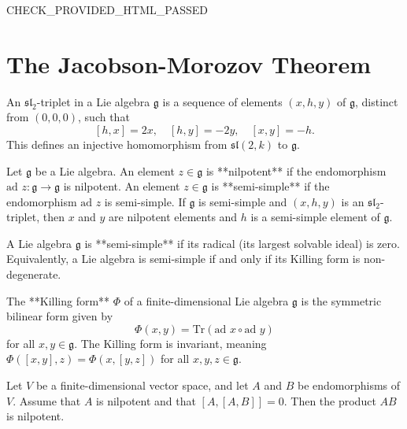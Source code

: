 CHECK_PROVIDED_HTML_PASSED

\chapter{The Jacobson-Morozov Theorem}

\begin{definition}
    \label{def:sl2_triplet}
    An $\mathfrak{sl}_2$-triplet in a Lie algebra $\mathfrak{g}$ is a sequence of elements $(x, h, y)$ of $\mathfrak{g}$, distinct from $(0, 0, 0)$, such that
    $$[h, x] = 2x, \quad [h, y] = -2y, \quad [x, y] = -h.$$
    This defines an injective homomorphism from $\mathfrak{sl}(2, k)$ to $\mathfrak{g}$.
\end{definition}

\begin{definition}
    \label{def:nilpotent_and_semi_simple_elements}
    Let $\mathfrak{g}$ be a Lie algebra. An element $z \in \mathfrak{g}$ is **nilpotent** if the endomorphism $\text{ad } z: \mathfrak{g} \to \mathfrak{g}$ is nilpotent. An element $z \in \mathfrak{g}$ is **semi-simple** if the endomorphism $\text{ad } z$ is semi-simple. If $\mathfrak{g}$ is semi-simple and $(x, h, y)$ is an $\mathfrak{sl}_2$-triplet, then $x$ and $y$ are nilpotent elements and $h$ is a semi-simple element of $\mathfrak{g}$.
\end{definition}

\begin{definition}
    \label{def:semi_simple_lie_algebra}
    A Lie algebra $\mathfrak{g}$ is **semi-simple** if its radical (its largest solvable ideal) is zero. Equivalently, a Lie algebra is semi-simple if and only if its Killing form is non-degenerate.
\end{definition}

\begin{definition}
    \label{def:killing_form}
    The **Killing form** $\Phi$ of a finite-dimensional Lie algebra $\mathfrak{g}$ is the symmetric bilinear form given by
    $$\Phi(x, y) = \text{Tr}(\text{ad } x \circ \text{ad } y)$$
    for all $x, y \in \mathfrak{g}$. The Killing form is invariant, meaning $\Phi([x, y], z) = \Phi(x, [y, z])$ for all $x, y, z \in \mathfrak{g}$.
\end{definition}

\begin{lemma}
    \label{lem:nilpotency_of_product}
    Let $V$ be a finite-dimensional vector space, and let $A$ and $B$ be endomorphisms of $V$. Assume that $A$ is nilpotent and that $[A, [A, B]] = 0$. Then the product $AB$ is nilpotent.
\end{lemma}

